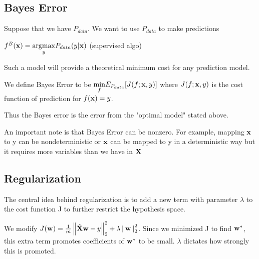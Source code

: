 \subsection{Bayes Error}

Suppose that we have $P_{data}$. We want to use $P_{data}$ to make predictions
\begin{example}
    $f^B(\vx)=\underset{y}{\argmax}P_{data}(y|\vx)$ (supervised algo)
\end{example}

Such a model will provide a theoretical minimum cost for any prediction model.

\begin{definition}
    We define Bayes Error to be $\underset{f}{\min}E_{P_{data}}[J(f;\vx, y)]$ where $J(f;\vx, y)$ is the cost function of prediction for $f(\vx)=y$.
\end{definition}

Thus the Bayes error is the error from the "optimal model" stated above.

An important note is that Bayes Error can be nonzero. For example, mapping $\vx$ to y can be nondeterministic or $\vx$ can be mapped to y in a deterministic way but it requires more variables than we have in $\MX$

\subsection{Regularization}

The central idea behind regularization is to add a new term with parameter $\lambda$ to the cost function J to further restrict the hypothesis space.

\begin{example}
    We modify $J(\vw)=\frac{1}{m}\norm{\hat{\MX}\vw-y}_2^2+\lambda\norm{\vw}_2^2$. Since we minimized J to find $\vw^\ast$, this extra term promotes coefficients of $\vw^\ast$ to be small. $\lambda$ dictates how strongly this is promoted.
\end{example}

